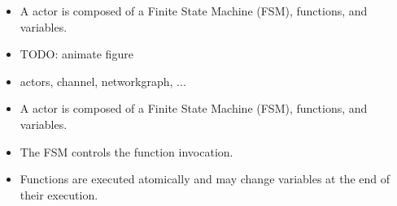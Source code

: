 \begin{frame}[t]
\begin{figure}
\centering
\resizebox{0.4\columnwidth}{!}{}
\end{figure}
\begin{itemize}
\item A \SysteMoC{} actor is composed of a Finite State Machine (FSM), functions, and variables.
\end{itemize}
\end{frame}







\begin{frame}
\begin{itemize}
\item TODO: animate figure
\item actors, channel, networkgraph, ...
\end{itemize}
\end{frame}





\begin{frame}
\begin{figure}
\centering
\resizebox{0.7\columnwidth}{!}{}
\end{figure}
\begin{itemize}
\item A \SysteMoC{} actor is composed of a Finite State Machine (FSM), functions, and variables.
\item The FSM controls the function invocation.
\item Functions are executed atomically and may change variables at the end of their execution.
\end{itemize}
\end{frame}

